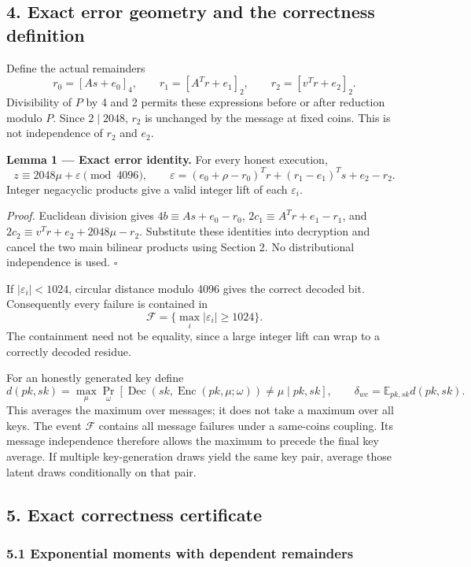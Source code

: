 \documentclass[
  10pt,
  a4paper,
]{article}
\begin{document}
\subsection{4. Exact error geometry and the correctness
definition}\label{exact-error-geometry-and-the-correctness-definition}

Define the actual remainders \[
r_0=[As+e_0]_4,\qquad
r_1=[A^Tr+e_1]_2,\qquad
r_2=[v^Tr+e_2]_2.
\] Divisibility of \(P\) by 4 and 2 permits these expressions before or
after reduction modulo \(P\). Since \(2\mid2048\), \(r_2\) is unchanged
by the message at fixed coins. This is not independence of \(r_2\) and
\(e_2\).

\textbf{Lemma 1 --- Exact error identity.} For every honest execution,
\[
z\equiv2048\mu+\varepsilon\pmod{4096},\qquad
\varepsilon=(e_0+\rho-r_0)^Tr+(r_1-e_1)^Ts+e_2-r_2.
\] Integer negacyclic products give a valid integer lift of each
\(\varepsilon_i\).

\emph{Proof.} Euclidean division gives \(4b\equiv As+e_0-r_0\),
\(2c_1\equiv A^Tr+e_1-r_1\), and \(2c_2\equiv v^Tr+e_2+2048\mu-r_2\).
Substitute these identities into decryption and cancel the two main
bilinear products using Section 2. No distributional independence is
used. \(\square\)

If \(|\varepsilon_i|<1024\), circular distance modulo 4096 gives the
correct decoded bit. Consequently every failure is contained in \[
\mathcal F=\{\max_i|\varepsilon_i|\ge1024\}.
\] The containment need not be equality, since a large integer lift can
wrap to a correctly decoded residue.

For an honestly generated key define \[
d(pk,sk)=\max_\mu\Pr_\omega[
\operatorname{Dec}(sk,\operatorname{Enc}(pk,\mu;\omega))\ne\mu\mid pk,sk],
\qquad
\delta_{wc}=\mathbb E_{pk,sk}d(pk,sk).
\] This averages the maximum over messages; it does not take a maximum
over all keys. The event \(\mathcal F\) contains all message failures
under a same-coins coupling. Its message independence therefore allows
the maximum to precede the final key average. If multiple key-generation
draws yield the same key pair, average those latent draws conditionally
on that pair.

\subsection{5. Exact correctness
certificate}\label{exact-correctness-certificate}

\subsubsection{5.1 Exponential moments with dependent
remainders}\label{exponential-moments-with-dependent-remainders}
\end{document}
